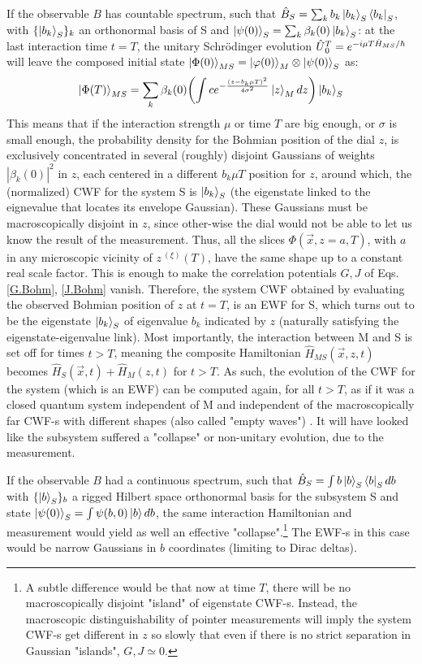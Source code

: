 \documentclass[11pt, a4paper]{article} %
\begin{document}
If the observable $B$ has countable spectrum, such that $\hat{B}_S=\sum_k b_k \ket{b_k}_S\bra{b_k}_S$, with $\{\ket{b_k}_S\}_k$ an orthonormal basis of S and $\ket{\psi(0)}_S=\sum_k \beta_k(0)\ket{b_k}_S$: at the last interaction time $t=T$, the unitary Schrödinger evolution $\hat{U} \null_{0}^T=e^{-i\mu T \hat{H}_{MS}/\hbar}$ will leave the composed initial state $\ket{\Phi(0)}_{MS}=\ket{\varphi(0)}_M\otimes\ket{\psi(0)}_S$ as:\vspace{-0.15cm}
\begin{equation}\label{postM1}
\ket{\Phi(T)}_{MS}=\sum_k \beta_k(0)\qty(\int c e^{-\frac{(z-b_k\mu T)^2}{4\sigma^2}}\ket{z}_M dz )\ket{b_k}_S
\end{equation}
This means that if the interaction strength $\mu$ or time $T$ are big enough, or $\sigma$ is small enough, the probability density for the Bohmian position of the dial $z$, is exclusively concentrated in several (roughly) disjoint Gaussians of weights $|\beta_k(0)|^2$ in $z$, each centered in a different $b_k \mu T$ position for $z$, around which, the (normalized) CWF for the system S is $\ket{b_k}_S$ (the eigenstate linked to the eignevalue that locates its envelope Gaussian). These Gaussians must be macroscopically disjoint in $z$, since other-wise the dial would not be able to let us know the result of the measurement. Thus, all the slices $\Phi(\vec{x},z=a,T)$, with $a$ in any microscopic vicinity of $z^{\: (\xi)}(T)$, have the same shape up to a constant real scale factor. This is enough to make the correlation potentials $G,J$ of Eqs. \eqref{G.Bohm}, \eqref{J.Bohm} vanish. Therefore, the system CWF obtained by evaluating the observed Bohmian position of $z$ at $t=T$, is an EWF for S, which turns out to be the eigenstate $\ket{b_k}_S$ of eigenvalue $b_k$ indicated by $z$ (naturally satisfying the eigenstate-eigenvalue link). Most importantly, the interaction between M and S is set off for times $t>T$, meaning the composite Hamiltonian $\hat{H}_{MS}(\vec{x},z,t)$ becomes $\hat{H}_S(\vec{x},t)+\hat{H}_M(z,t)$ for $t>T$. As such, the evolution of the CWF for the system (which is an EWF) can be computed again, for all $t>T$, as if it was a closed quantum system independent of M and independent of the macroscopically far CWF-s with different shapes (also called "empty waves") \cite{JordiXavier}. It will have looked like the subsystem suffered a "collapse" or non-unitary evolution, due to the measurement.
 

If the observable $B$ had a continuous spectrum, such that $\hat{B}_S=\int b\ket{b}_S\bra{b}_Sdb$ with $\{\ket{b}_S\}_b$ a rigged Hilbert space orthonormal basis for the subsystem S and state $\ket{\psi(0)}_S=\int\psi(b,0)\ket{b}db$, the same interaction Hamiltonian and measurement would yield as well an effective "collapse".\footnote{A subtle difference would be that now at time $T$, there will be no macroscopically disjoint "island" of eigenstate CWF-s. Instead, the macroscopic distinguishability of pointer measurements will imply the system CWF-s get different in $z$ so slowly that even if there is no strict separation in Gaussian "islands", $G,J\simeq 0$.} The EWF-s in this case would be narrow Gaussians in $b$ coordinates (limiting to Dirac deltas).\vspace{-0.1cm}
\end{document}
